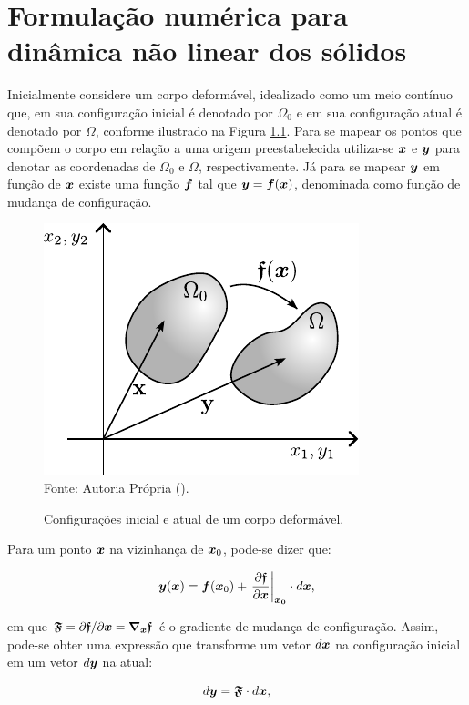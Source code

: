 \chapter{Formulação numérica para dinâmica não linear dos sólidos} \label{EGDS}

Inicialmente considere um corpo deformável, idealizado como um meio contínuo que, em sua configuração inicial é denotado por $\Omega_0$ e em sua configuração atual é denotado por $\Omega$, conforme ilustrado na Figura \ref{fig:Cont}. Para se mapear os pontos que compõem o corpo em relação a uma origem preestabelecida utiliza-se $\boldsymbol{x}$ e $\boldsymbol{y}$ para denotar as coordenadas de $\Omega_0$ e $\Omega$, respectivamente. Já para se mapear $\boldsymbol{y}$ em função de $\boldsymbol{x}$ existe uma função $\boldsymbol{f}$ tal que $\boldsymbol{y}=\boldsymbol{f}(\boldsymbol{x})$, denominada como função de mudança de configuração.

\begin{figure}[h!]
    \centering
    \caption{Configurações inicial e atual de um corpo deformável.}
    \includegraphics[width=.4\linewidth]{Figuras/Cont.pdf}
    \\Fonte: Autoria Própria (\the\year).
    \label{fig:Cont}
\end{figure}

Para um ponto $\boldsymbol{x}$ na vizinhança de $\boldsymbol{x}_0$, pode-se dizer que:

\begin{equation}
    \boldsymbol{y}(\boldsymbol{x})=\boldsymbol{f}(\boldsymbol{x}_0)+\left.\frac{\partial{\boldsymbol{\mathfrak{f}}}}{\partial{\boldsymbol{x}}}\right|_{\boldsymbol{x_0}}\cdot d\boldsymbol{x}\text{,}
\end{equation}

\noindent em que $\boldsymbol{\mathfrak{F}}=\partial\boldsymbol{\mathfrak{f}}/\partial\boldsymbol{x}=\boldsymbol{\nabla_x}\boldsymbol{\mathfrak{f}}$ é o gradiente de mudança de configuração. Assim, pode-se obter uma expressão que transforme um vetor $d\boldsymbol{x}$ na configuração inicial em um vetor $d\boldsymbol{y}$ na atual:

\begin{equation}
    d\boldsymbol{y}=\boldsymbol{\mathfrak{F}}\cdot d\boldsymbol{x}\text{,}\label{eq:dyAdx}
\end{equation}

